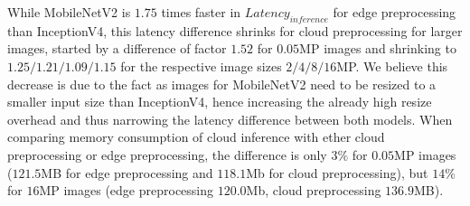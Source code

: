 While MobileNetV2 is $1.75$ times faster in $Latency_{inference}$ for edge preprocessing than InceptionV4, this latency difference shrinks for cloud preprocessing for larger images, started by a difference of factor $1.52$ for $0.05$MP images and shrinking to $1.25/1.21/1.09/1.15$ for the respective image sizes $2/4/8/16$MP.
We believe this decrease is due to the fact as images for MobileNetV2 need to be resized to a smaller input size than InceptionV4, hence increasing the already high resize overhead and thus narrowing the latency difference between both models.
When comparing memory consumption of cloud inference with ether cloud preprocessing or edge preprocessing, the difference is only $3\%$ for  $0.05$MP images ($121.5$MB for edge preprocessing and $118.1$Mb for cloud preprocessing), but $14\%$ for $16$MP images (edge preprocessing $120.0$Mb, cloud preprocessing $136.9$MB).




